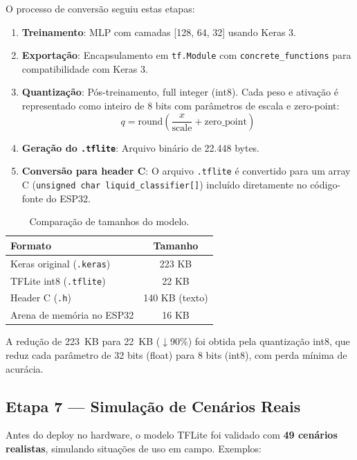 \documentclass[12pt, a4paper]{article}
\begin{document}
O processo de convers\~{a}o seguiu estas etapas:

\begin{enumerate}
  \item \textbf{Treinamento}: MLP com camadas [128, 64, 32] usando Keras 3.
  \item \textbf{Exporta\c{c}\~{a}o}: Encapsulamento em \texttt{tf.Module} com \texttt{concrete\_functions} para compatibilidade com Keras 3.
  \item \textbf{Quantiza\c{c}\~{a}o}: P\'{o}s-treinamento, full integer (int8). Cada peso e ativa\c{c}\~{a}o \'{e} representado como inteiro de 8 bits com par\^{a}metros de escala e zero-point:
    \[
      q = \text{round}\left(\frac{x}{\text{scale}} + \text{zero\_point}\right)
    \]
  \item \textbf{Gera\c{c}\~{a}o do \texttt{.tflite}}: Arquivo bin\'{a}rio de 22.448 bytes.
  \item \textbf{Convers\~{a}o para header C}: O arquivo \texttt{.tflite} \'{e} convertido para um array C (\texttt{unsigned char liquid\_classifier[]}) inclu\'{i}do diretamente no c\'{o}digo-fonte do ESP32.
\end{enumerate}

\begin{table}[H]
  \centering
  \caption{Compara\c{c}\~{a}o de tamanhos do modelo.}
  \begin{tabular}{lc}
    \toprule
    \textbf{Formato} & \textbf{Tamanho} \\
    \midrule
    Keras original (\texttt{.keras}) & 223 KB \\
    TFLite int8 (\texttt{.tflite})   & 22 KB \\
    Header C (\texttt{.h})           & 140 KB (texto) \\
    Arena de mem\'{o}ria no ESP32       & 16 KB \\
    \bottomrule
  \end{tabular}
\end{table}

A redu\c{c}\~{a}o de 223~KB para 22~KB ($\downarrow$90\%) foi obtida pela quantiza\c{c}\~{a}o int8, que reduz cada par\^{a}metro de 32 bits (float) para 8 bits (int8), com perda m\'{i}nima de acur\'{a}cia.

\subsection{Etapa 7 --- Simula\c{c}\~{a}o de Cen\'{a}rios Reais}

Antes do deploy no hardware, o modelo TFLite foi validado com \textbf{49 cen\'{a}rios realistas}, simulando situa\c{c}\~{o}es de uso em campo. Exemplos:
\end{document}
